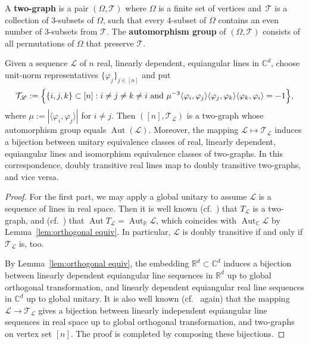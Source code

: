 \begin{definition}
A \textbf{two-graph} is a pair $(\Omega, \mathcal{T})$ where $\Omega$ is a finite set of vertices and~$\mathcal{T}$ is a collection of 3-subsets of $\Omega$, such that every 4-subset of $\Omega$ contains an even number of 3-subsets from $\mathcal{T}$.
The \textbf{automorphism group} of $(\Omega,\mathcal{T})$ consists of all permutations of $\Omega$ that preserve $\mathcal{T}$.
\end{definition}

\begin{proposition}
\label{prop:real lines are two-graphs}
Given a sequence $\mathscr{L}$ of $n$ real, linearly dependent, equiangular lines in $\mathbb{C}^d$, choose unit-norm representatives $\{ \varphi_j \}_{j\in [n]}$ and put
\[ \mathcal{T}_{\mathscr{L}} := \Bigl\{ \{ i,j,k\} \subset [n] : i \neq j \neq k \neq i \text{ and } \mu^{-3} \langle \varphi_i, \varphi_j \rangle \langle \varphi_j, \varphi_k \rangle \langle \varphi_k, \varphi_i \rangle = -1 \Bigr\}, \]
where $\mu := | \langle \varphi_i, \varphi_j \rangle |$ for $i \neq j$.
Then $([n], \mathcal{T}_{\mathscr{L}})$ is a two-graph whose automorphism group equals $\operatorname{Aut}(\mathscr{L})$.
Moreover, the mapping $\mathscr{L} \mapsto \mathcal{T}_{\mathscr{L}}$ induces a bijection between unitary equivalence classes of real, linearly dependent, equiangular lines and isomorphism equivalence classes of two-graphs.
In this correspondence, doubly transitive real lines map to doubly transitive two-graphs, and vice versa.
\end{proposition}

\begin{proof}
For the first part, we may apply a global unitary to assume $\mathscr{L}$ is a sequence of lines in real space.
Then it is well known (cf.\ \cite{Seidel:91}) that $T_{\mathscr{L}}$ is a two-graph, and (cf.\ \cite{Cameron:77}) that $\operatorname{Aut} T_{\mathscr{L}} = \operatorname{Aut}_{\mathbb{R}} \mathscr{L}$, which coincides with $\operatorname{Aut}_{\mathbb{C}} \mathscr{L}$ by Lemma~\ref{lem:orthogonal equiv}.
In particular, $\mathscr{L}$ is doubly transitive if and only if $\mathcal{T}_{\mathscr{L}}$ is, too.

By Lemma~\ref{lem:orthogonal equiv}, the embedding $\mathbb{R}^d \subset \mathbb{C}^d$ induces a bijection between linearly dependent equiangular line sequences in $\mathbb{R}^d$ up to global orthogonal transformation, and linearly dependent equiangular real line sequences in $\mathbb{C}^d$ up to global unitary.
It is also well known (cf.\ \cite{Seidel:91} again) that the mapping $\mathscr{L} \to \mathcal{T}_{\mathscr{L}}$ gives a bijection between linearly independent equiangular line sequences in real space up to global orthogonal transformation, and two-graphs on vertex set $[n]$.
The proof is completed by composing these bijections.
\end{proof}

